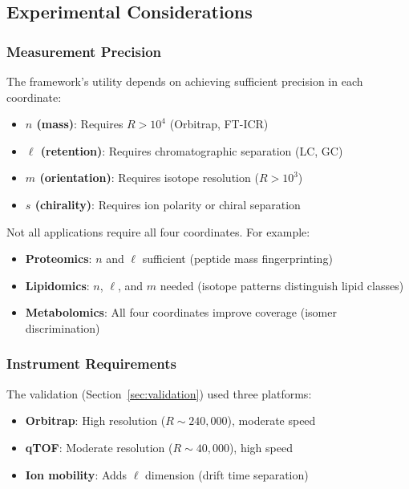 \documentclass[twocolumn,10pt]{article}
\begin{document}
\subsection{Experimental Considerations}

\subsubsection{Measurement Precision}

The framework's utility depends on achieving sufficient precision in each coordinate:

\begin{itemize}
    \item \textbf{$n$ (mass)}: Requires $R > 10^4$ (Orbitrap, FT-ICR)
    \item \textbf{$\ell$ (retention)}: Requires chromatographic separation (LC, GC)
    \item \textbf{$m$ (orientation)}: Requires isotope resolution ($R > 10^3$)
    \item \textbf{$s$ (chirality)}: Requires ion polarity or chiral separation
\end{itemize}

Not all applications require all four coordinates. For example:
\begin{itemize}
    \item \textbf{Proteomics}: $n$ and $\ell$ sufficient (peptide mass fingerprinting)
    \item \textbf{Lipidomics}: $n$, $\ell$, and $m$ needed (isotope patterns distinguish lipid classes)
    \item \textbf{Metabolomics}: All four coordinates improve coverage (isomer discrimination)
\end{itemize}

\subsubsection{Instrument Requirements}

The validation (Section~\ref{sec:validation}) used three platforms:
\begin{itemize}
    \item \textbf{Orbitrap}: High resolution ($R \sim 240{,}000$), moderate speed
    \item \textbf{qTOF}: Moderate resolution ($R \sim 40{,}000$), high speed
    \item \textbf{Ion mobility}: Adds $\ell$ dimension (drift time separation)
\end{itemize}
\end{document}
